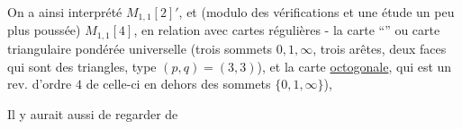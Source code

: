 On a ainsi interprété $M_{1,1}[2]'$, et
(modulo des vérifications et une étude un peu plus poussée)
$M_{1,1}[4]$, en relation avec  cartes
régulières - la carte ``''
ou carte triangulaire pondérée universelle
(trois sommets $0,1,\infty$,
trois arêtes, deux faces qui sont des triangles, type
$(p,q)=(3,3)$), et la carte \uline{octogonale},
qui est un rev. d'ordre $4$ de celle-ci
\unsure{(}
en dehors des sommets $\{0,1,\infty\}$),

Il y aurait  aussi de regarder de
